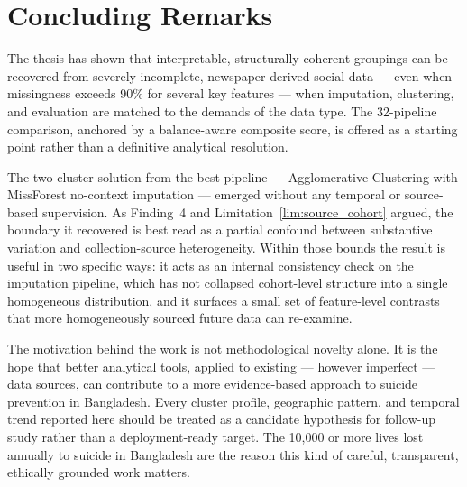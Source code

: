 \section{Concluding Remarks}

The thesis has shown that interpretable, structurally coherent groupings can be recovered from severely incomplete, newspaper-derived social data --- even when missingness exceeds 90\% for several key features --- when imputation, clustering, and evaluation are matched to the demands of the data type. The 32-pipeline comparison, anchored by a balance-aware composite score, is offered as a starting point rather than a definitive analytical resolution.

The two-cluster solution from the best pipeline --- Agglomerative Clustering with MissForest no-context imputation --- emerged without any temporal or source-based supervision. As Finding~4 and Limitation~\ref{lim:source_cohort} argued, the boundary it recovered is best read as a partial confound between substantive variation and collection-source heterogeneity. Within those bounds the result is useful in two specific ways: it acts as an internal consistency check on the imputation pipeline, which has not collapsed cohort-level structure into a single homogeneous distribution, and it surfaces a small set of feature-level contrasts that more homogeneously sourced future data can re-examine.

The motivation behind the work is not methodological novelty alone. It is the hope that better analytical tools, applied to existing --- however imperfect --- data sources, can contribute to a more evidence-based approach to suicide prevention in Bangladesh. Every cluster profile, geographic pattern, and temporal trend reported here should be treated as a candidate hypothesis for follow-up study rather than a deployment-ready target. The 10,000 or more lives lost annually to suicide in Bangladesh \cite{ref1,ref50} are the reason this kind of careful, transparent, ethically grounded work matters.
